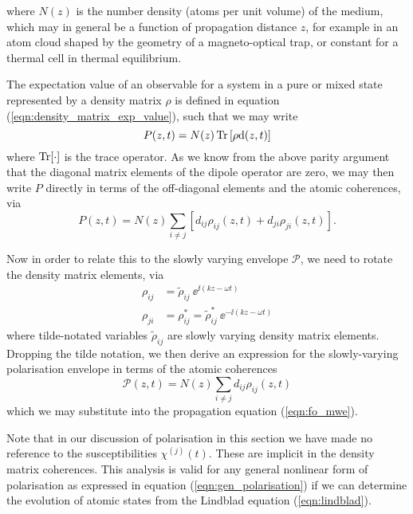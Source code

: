     where $N(z)$ is the number density (atoms per unit volume) of the medium,
    which may in general be a function of propagation distance $z$, for example
    in an atom cloud shaped by the geometry of a magneto-optical
    trap\cite{Adams1997}, or constant for a thermal cell in thermal equilibrium.

    The expectation value of an observable for a system in a pure or mixed state
    represented by a density matrix $\rho$ is defined in equation
    (\ref{eqn:density_matrix_exp_value}), such that we may write
    \begin{equation}
      P(z,t) = N(z) \operatorname{Tr}{ \left[ \rho \mathrm{d}(z,t) \right] }
    \end{equation}
    where $\operatorname{Tr}[\cdot]$ is the trace operator. As we know from the above parity argument
    that the diagonal matrix elements of the dipole operator are zero, we may
    then write $P$ directly in terms of the off-diagonal elements and the atomic
    coherences, via
    \begin{equation}
      P(z,t) = N(z) \sum_{i \ne j}{\left[ d_{ij} \rho_{ij}(z,t) + 
                                 d_{ji} \rho_{ji}(z,t) \right] }.
    \end{equation}

    Now in order to relate this to the slowly varying envelope $\mathcal{P}$, we
    need to rotate the density matrix elements, via
    \begin{align*}
      \rho_{ij} &= \tilde{\rho}_{ij} ~ \ee^{\ii (k z - \omega t)} \\
      \rho_{ji} &= \rho^*_{ij} = \tilde{\rho}^*_{ij} ~ \ee^{-\ii (k z - \omega t)}
    \end{align*}
    where tilde-notated variables $\tilde{\rho}_{ij}$ are slowly varying density
    matrix elements. Dropping the tilde notation, we then derive an expression
    for the slowly-varying polarisation envelope in terms of the atomic
    coherences
    \begin{equation} 
      \mathcal{P}(z,t) = N(z) \sum_{i \ne j} d_{ij} \rho_{ij}(z,t)
      \label{eqn:polarisation_coherences}
    \end{equation} 
    which we may substitute into the propagation equation
    (\ref{eqn:fo_mwe}).

    Note that in our discussion of polarisation in this section we have made no
    reference to the susceptibilities $\chi^{(j)}(t)$. These are implicit in the
    density matrix coherences. This analysis is valid for any general nonlinear
    form of polarisation as expressed in equation (\ref{eqn:gen_polarisation})
    if we can determine the evolution of atomic states from the Lindblad
    equation (\ref{eqn:lindblad}). 

